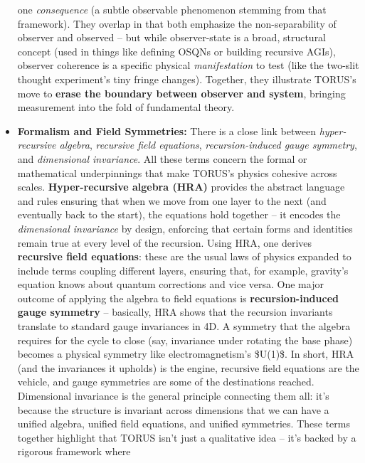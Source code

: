 \documentclass[
]{article}
\begin{document}
\begin{itemize}
  one \emph{consequence} (a subtle observable phenomenon stemming from
  that framework). They overlap in that both emphasize the
  non-separability of observer and observed -- but while observer-state
  is a broad, structural concept (used in things like defining OSQNs or
  building recursive AGIs), observer coherence is a specific physical
  \emph{manifestation} to test (like the two-slit thought experiment's
  tiny fringe changes). Together, they illustrate TORUS's move to
  \textbf{erase the boundary between observer and system}, bringing
  measurement into the fold of fundamental theory.
\item
  \textbf{Formalism and Field Symmetries:} There is a close link between
  \emph{hyper-recursive algebra}, \emph{recursive field equations},
  \emph{recursion-induced gauge symmetry}, and \emph{dimensional
  invariance}. All these terms concern the formal or mathematical
  underpinnings that make TORUS's physics cohesive across scales.
  \textbf{Hyper-recursive algebra (HRA)} provides the abstract language
  and rules ensuring that when we move from one layer to the next (and
  eventually back to the start), the equations hold together -- it
  encodes the \emph{dimensional invariance} by design, enforcing that
  certain forms and identities remain true at every level of the
  recursion\hspace{0pt}. Using HRA, one derives \textbf{recursive field
  equations}: these are the usual laws of physics expanded to include
  terms coupling different layers, ensuring that, for example, gravity's
  equation knows about quantum corrections and vice versa\hspace{0pt}.
  One major outcome of applying the algebra to field equations is
  \textbf{recursion-induced gauge symmetry} -- basically, HRA shows that
  the recursion invariants translate to standard gauge invariances in
  4D\hspace{0pt}. A symmetry that the algebra requires for the cycle to
  close (say, invariance under rotating the base phase) becomes a
  physical symmetry like electromagnetism's \$U(1)\$. In short, HRA (and
  the invariances it upholds) is the engine, recursive field equations
  are the vehicle, and gauge symmetries are some of the destinations
  reached. Dimensional invariance is the general principle connecting
  them all: it's because the structure is invariant across dimensions
  that we can have a unified algebra, unified field equations, and
  unified symmetries. These terms together highlight that TORUS isn't
  just a qualitative idea -- it's backed by a rigorous framework where

\end{itemize}
\end{document}
